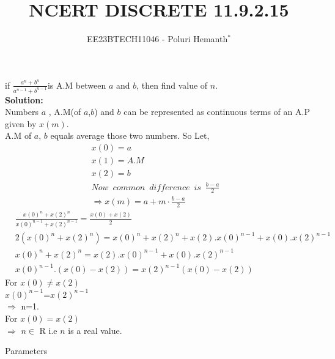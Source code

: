 \documentclass[journal,12pt,twocolumn]{IEEEtran}
\theoremstyle{remark}
\begin{document}

\vspace{3cm}


\title{NCERT DISCRETE 11.9.2.15}
\author{EE23BTECH11046 - Poluri Hemanth$^{*}$}



if $\frac{a^n +b^n}{a^{n-1} + b^{n-1}}$is A.M between $a$ and $b$, then find value of $n$.
\\

\textbf{Solution:}\\
Numbers $a$ , A.M(of $a$,$b$) and $b$ can be represented as continuous terms of an A.P given by $x(m)$.\\
A.M of $a$, $b$ equals average those two numbers.
 So Let,
 \begin{align}
	 &x(0)=a&&\\
	 &x(1)=A.M&& \\
	 &x(2)=b&&\\
	 &Now\;\:common\:\;difference\: \;is\:\;\frac{b-a}{2}&&\\
	 &\Rightarrow x(m)=a+m\cdot\frac{b-a}{2}&&
\end{align}
\begin{align}
	 &\frac{x(0)^n +x(2)^n}{x(0)^{n-1} + x(2)^{n-1}}= \frac{x(0)+x(2)}{2} && \\
	 &2(x(0)^n +x(2)^n) = x(0)^n +x(2)^n +x(2).x(0)^{n-1}+x(0).x(2)^{n-1} &&\\
	 &x(0)^n +x(2)^n = x(2).x(0)^{n-1}+x(0).x(2)^{n-1}&& \\
	 &x(0)^{n-1}.(x(0)-x(2))=x(2)^{n-1}(x(0)-x(2))&&
 \end{align}
 For $x(0) \neq x(2)$ \\
 $x(0)^{n-1}$=$x(2)^{n-1}$ \\
 $\Rightarrow$ n=1.\\
  For $x(0)=x(2)$\\
$\Rightarrow$ $n\in$ R  i.e $n$ is a real value.\newline
\begin{table}[h!]
    
    \caption{Parameters}
    \label{tab:11.9.2.15}
\end{table}
\end{document}
